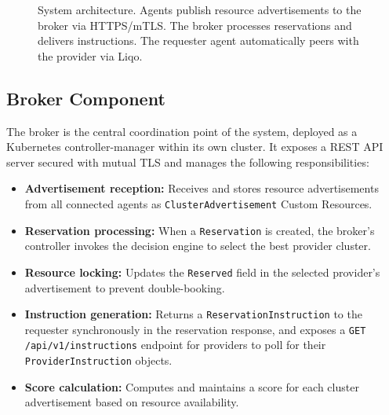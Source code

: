 \begin{figure}[htbp]
\caption{System architecture. Agents publish resource advertisements to the broker via HTTPS/mTLS. The broker processes reservations and delivers instructions. The requester agent automatically peers with the provider via Liqo.}
\label{fig:architecture}
\end{figure}

\subsection{Broker Component}
\label{subsec:broker-design}

The broker is the central coordination point of the system, deployed as a Kubernetes controller-manager within its own cluster. It exposes a REST API server secured with mutual TLS and manages the following responsibilities:

\begin{itemize}
    \item \textbf{Advertisement reception:} Receives and stores resource advertisements from all connected agents as \texttt{ClusterAdvertisement} Custom Resources.
    \item \textbf{Reservation processing:} When a \texttt{Reservation} is created, the broker's controller invokes the decision engine to select the best provider cluster.
    \item \textbf{Resource locking:} Updates the \texttt{Reserved} field in the selected provider's advertisement to prevent double-booking.
    \item \textbf{Instruction generation:} Returns a \texttt{ReservationInstruction} to the requester synchronously in the reservation response, and exposes a \texttt{GET /api/v1/instructions} endpoint for providers to poll for their \texttt{ProviderInstruction} objects.
    \item \textbf{Score calculation:} Computes and maintains a score for each cluster advertisement based on resource availability.
\end{itemize}

